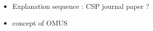 \begin{itemize}
    \item Explanation sequence : CSP journal paper ?
    \item concept of OMUS
\end{itemize}